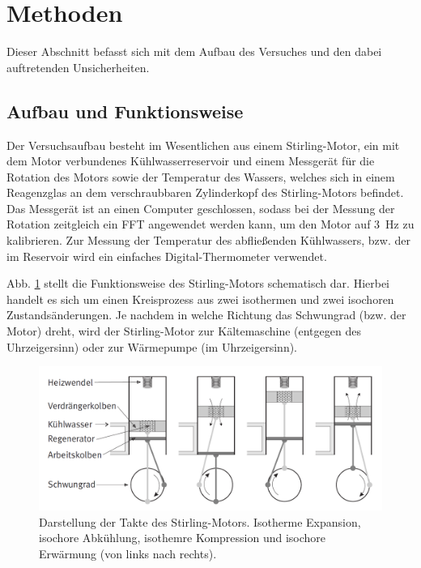 \section{Methoden}
	
	Dieser Abschnitt befasst sich mit dem Aufbau des Versuches und den dabei auftretenden Unsicherheiten.
	
	\subsection{Aufbau und Funktionsweise}	
		
		Der Versuchsaufbau besteht im Wesentlichen aus einem Stirling-Motor, ein mit dem Motor verbundenes Kühlwasserreservoir und einem Messgerät für die Rotation des Motors sowie der Temperatur des Wassers, welches sich in einem Reagenzglas an dem verschraubbaren Zylinderkopf des Stirling-Motors befindet.
		Das Messgerät ist an einen Computer geschlossen, sodass bei der Messung der Rotation zeitgleich ein FFT angewendet werden kann, um den Motor auf \SI{3}{\hertz} zu kalibrieren.
		Zur Messung der Temperatur des abfließenden Kühlwassers, bzw. der im Reservoir wird ein einfaches Digital-Thermometer verwendet.
		
		Abb. \ref{fig:Aufbau} stellt die Funktionsweise des Stirling-Motors schematisch dar. 
		Hierbei handelt es sich um einen Kreisprozess aus zwei isothermen und zwei isochoren Zustandsänderungen.
		Je nachdem in welche Richtung das Schwungrad (bzw. der Motor) dreht, wird der Stirling-Motor zur Kältemaschine (entgegen des Uhrzeigersinn) oder zur Wärmepumpe (im Uhrzeigersinn). 
		\begin{figure}[ht]
			\centering
			\includegraphics[width=\textwidth]{Aufbau.png}
			\caption{Darstellung der Takte des Stirling-Motors. Isotherme Expansion, isochore Abkühlung, isothemre Kompression und isochore Erwärmung (von links nach rechts).\cite{WWU}}
			\label{fig:Aufbau}	
		\end{figure}
				
